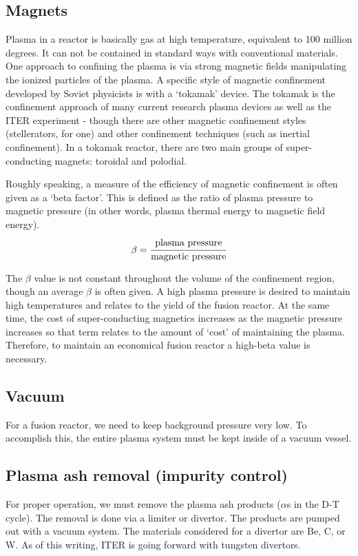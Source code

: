 \documentclass[11pt]{report} %
\begin{document}
\subsection{Magnets}\label{sec:magnets}
Plasma in a reactor is basically gas at high temperature, equivalent to 100 million degrees. It can not be contained in standard ways with conventional materials. One approach to confining the plasma is via strong magnetic fields manipulating the ionized particles of the plasma. A specific style of magnetic confinement developed by Soviet physicists is with a `tokamak' device. The tokamak is the confinement approach of many current research plasma devices as well as the ITER experiment - though there are other magnetic confinement styles (stellerators, for one) and other confinement techniques (such as inertial confinement). In a tokamak reactor, there are two main groups of super-conducting magnets: toroidal and polodial.

Roughly speaking, a measure of the efficiency of magnetic confinement is often given as a `beta factor'. This is defined as the ratio of plasma pressure to magnetic pressure (in other words, plasma thermal energy to magnetic field energy). 
\begin{equation}
\beta = \cfrac{\text{plasma pressure}}{\text{magnetic pressure}}
\end{equation}

The $\beta$ value is not constant throughout the volume of the confinement region, though an average $\beta$ is often given. A high plasma pressure is desired to maintain high temperatures and relates to the yield of the fusion reactor. At the same time, the cost of super-conducting magnetics increases as the magnetic pressure increases so that term relates to the amount of `cost' of maintaining the plasma. Therefore, to maintain an economical fusion reactor a high-beta value is necessary.

\subsection{Vacuum}
For a fusion reactor, we need to keep background pressure very low. To accomplish this, the entire plasma system must be kept inside of a vacuum vessel.

\subsection{Plasma ash removal (impurity control)}
For proper operation, we must remove the plasma ash products ($\alpha$s in the D-T cycle). The removal is done via a limiter or divertor. The products are pumped out with a vacuum system. The materials considered for a divertor are Be, C, or W. As of this writing, ITER is going forward with tungsten divertors.
\end{document}
